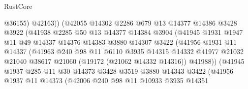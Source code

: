 \begin{lexlean}{RustCore}
\begin{coremodule}
                              @36155)
                            @42163))
                        (@42055
                          @14302
                          @2286
                          @679
                          @13
                          @14377
                          @14386
                          @3428
                          @3922
                          (@41938
                            @2285
                            @50
                            @13
                            @14377
                            @14384
                            @3904
                            (@41945
                              @1931
                              @1947
                              @11
                              @49
                              @14337
                              @14376
                              @14383
                              @3880
                              @14307
                              @3422
                              (@41956
                                @1931
                                @11
                                @14337
                                (@41963
                                  @240
                                  @98
                                  @11
                                  @6110
                                  @3935
                                  @14315
                                  @14332
                                  @41977
                                  @21032
                                  @21040
                                  @38617
                                  @21060
                                  (@19172 (@21062 @14332 @14316))
                                  @41988))
                              (@41945
                                @1937
                                @285
                                @11
                                @30
                                @14373
                                @3428
                                @3519
                                @3880
                                @14343
                                @3422
                                (@41956
                                  @1937
                                  @11
                                  @14373
                                  (@42006
                                    @240
                                    @98
                                    @11
                                    @10933
                                    @3935
                                    @14351

\end{coremodule}
\end{lexlean}
